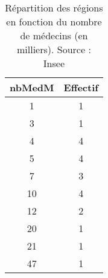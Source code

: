 \documentclass[a4paper,11pt]{article}
\begin{document}
\begin{table}
\begin{center}
\begin{tabular}{|c|c|}
\hline
\textbf{nbMedM}&\textbf{Effectif}\\ \hline \hline

1&1\\ \hline

3&1\\ \hline

4&4\\ \hline

5&4\\ \hline

7&3\\ \hline

10&4\\ \hline

12&2\\ \hline

20&1\\ \hline

21&1\\ \hline

47&1\\ \hline
\end{tabular} 
\caption{Répartition des régions en fonction du nombre de médecins (en milliers). Source : Insee}
\end{center}
\end{table}
\end{document}
